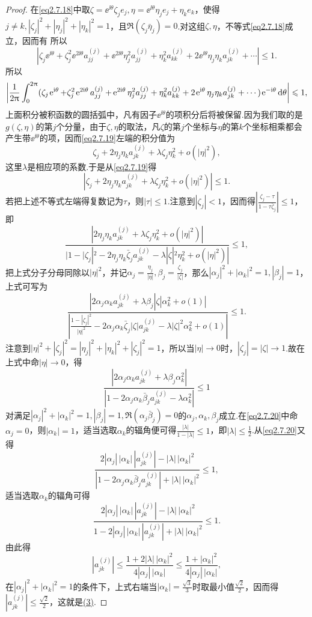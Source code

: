 \begin{proof}
在\eqref{eq2.7.18}中取$\zeta=\ee^{\ii\theta}\zeta_j e_j,\eta=\ee^{\ii\theta}\eta_j e_j+\eta_k e_k$，使得$j\neq k,|\zeta_j|^2+|\eta_j|^2+|\eta_k|^2=1$，且$\Re(\zeta_j\bar{\eta}_j)=0$.对这组$\zeta,\eta$，不等式\eqref{eq2.7.18}成立，因而有
所以
\[|\zeta_j \ee^{\ii\theta}+\zeta_j^2\ee^{2\ii\theta}a_{jj}^{(j)}+\ee^{2\ii\theta}\eta_j^2 a_{jj}^{(j)}+\eta_k^2a_{kk}^{(j)}+2\ee^{\ii\theta}\eta_j \eta_k a_{jk}^{(j)}+\cdots|\le1.\]
所以
\begin{equation}\label{eq2.7.19}
	\left|\frac1{2\pi}\int_{0}^{2\pi}(\zeta_j \ee^{\ii\theta}+\zeta_j^2\ee^{2\ii\theta}a_{jj}^{(j)}+\ee^{2\ii\theta}\eta_j^2 a_{jj}^{(j)}+\eta_k^2a_{kk}^{(j)}+2\ee^{\ii\theta}\eta_j \eta_k a_{jk}^{(j)}+\cdots)\ee^{-\ii\theta}\dif\theta\right|\le1,
\end{equation}
上面积分被积函数的圆括弧中，凡有因子$\ee^{\ii\theta}$的项积分后将被保留.因为我们取的是$g(\zeta,\eta)$的第$j$个分量，由于$\zeta,\eta$的取法，凡$\zeta$的第$j$个坐标与$\eta$的第$k$个坐标相乘都会产生带$\ee^{\ii\theta}$的项，因而\eqref{eq2.7.19}左端的积分值为
\[\zeta_j+2\eta_j \eta_k a_{jk}^{(j)}+\lambda\zeta_j \eta_k^2+o(|\eta|^2),\]
这里$\lambda$是相应项的系数.于是从\eqref{eq2.7.19}得
\[|\zeta_j+2\eta_j \eta_k a_{jk}^{(j)}+\lambda\zeta_j \eta_k^2+o(|\eta|^2)|\le1.\]
若把上述不等式左端得复数记为$\tau$，则$|\tau|\le1$.注意到$|\zeta_j|<1$，因而得$\left|\frac{\zeta_j-\tau}{1-\tau\bar{\zeta}_j}\right|\le1$，即
\[\frac{|2\eta_j \eta_k a_{jk}^{(j)}+\lambda\zeta_j \eta_k^2+o(|\eta|^2)|}{|1-|\zeta_j|^2-2\eta_j\eta_k\bar{\zeta}_j a_{jk}^{(j)}-\lambda|\zeta|^2\eta_k^2+o(|\eta|^2)|}\le1,\]
把上式分子分母同除以$|\eta|^2$，并记$\alpha_j=\frac{\eta_j}{|\eta|},\beta_j=\frac{\zeta_j}{|\zeta|}$，那么$|\alpha_j|^2+|\alpha_k|^2=1,|\beta_j|=1$，上式可写为
\[\frac{|2\alpha_j\alpha_k a_{jk}^{(j)}+\lambda\beta_j|\zeta|\alpha_k^2+o(1)|}{\left|\frac{1-|\zeta_j|^2}{|\eta|^2}-2\alpha_j\alpha_k\bar{\zeta}_j|\zeta|a_{jk}^{(j)}-\lambda|\zeta|^2\alpha_k^2+o(1)\right|}\le1.\]
注意到$|\eta|^2+|\zeta_j|^2=|\eta_j|^2+|\eta_k|^2+|\zeta_j|^2=1$，所以当$|\eta|\to0$时，$|\zeta_j|=|\zeta|\to1$.故在上式中命$|\eta|\to0$，得
\begin{equation}\label{eq2.7.20}
	\frac{|2\alpha_j\alpha_k a_{jk}^{(j)}+\lambda\beta_j \alpha_k^2|}{|1-2\alpha_j\alpha_k\bar{\beta}_ja_{jk}^{(j)}-\lambda\alpha_k^2|}\le1
\end{equation}
对满足$|\alpha_j|^2+|\alpha_k|^2=1,|\beta_j|=1,\Re(\alpha_j\bar{\beta}_j)=0$的$\alpha_j,\alpha_k,\beta_j$成立.在\eqref{eq2.7.20}中命$\alpha_j=0$，则$|\alpha_k|=1$，适当选取$\alpha_k$的辐角便可得$\frac{|\lambda|}{1-|\lambda|}\le1$，即$|\lambda|\le\frac12$.从\eqref{eq2.7.20}又得
\[\frac{2|\alpha_j|\,|\alpha_k|\,|a_{jk}^{(j)}|-|\lambda|\, |\alpha_k|^2}{|1-2\alpha_j\alpha_k\bar{\beta}_j a_{jk}^{(j)}|+|\lambda|\,|\alpha_k|^2}\le1,\]
适当选取$\alpha_k$的辐角可得
\[\frac{2|\alpha_j|\,|\alpha_k|\,|a_{jk}^{(j)}|-|\lambda|\, |\alpha_k|^2}{1-2|\alpha_j|\,|\alpha_k|\,|a_{jk}^{(j)}|+|\lambda|\,|\alpha_k|^2}\le1.\]
由此得
\[|a_{jk}^{(j)}|\le\frac{1+2|\lambda|\,|\alpha_k|^2}{4|\alpha_j|\,|\alpha_k|}\le\frac{1+|\alpha_k|^2}{4|\alpha_j|\,|\alpha_k|},\]
在$|\alpha_j|^2+|\alpha_k|^2=1$的条件下，上式右端当$|\alpha_k|=\frac{\sqrt{3}}{3}$时取最小值$\frac{\sqrt{2}}{2}$，因而得$|a_{jk}^{(j)}|\le\frac{\sqrt{2}}{2}$，这就是\hyperlink{2.7.4}{(3)}.


\end{proof}
